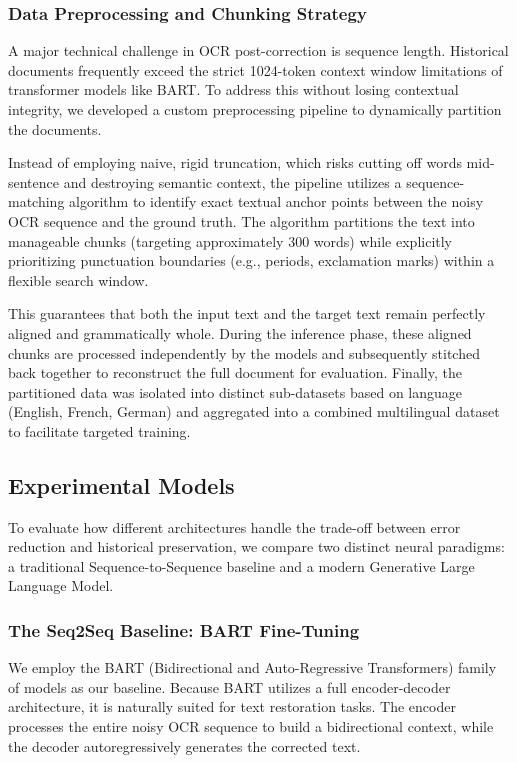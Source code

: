 \documentclass[11pt]{extarticle}
\begin{document}
\subsubsection{Data Preprocessing and Chunking Strategy}
A major technical challenge in OCR post-correction is sequence length. Historical documents frequently exceed the strict 1024-token context window limitations of transformer models like BART. To address this without losing contextual integrity, we developed a custom preprocessing pipeline to dynamically partition the documents.

Instead of employing naive, rigid truncation, which risks cutting off words mid-sentence and destroying semantic context, the pipeline utilizes a sequence-matching algorithm to identify exact textual anchor points between the noisy OCR sequence and the ground truth. The algorithm partitions the text into manageable chunks (targeting approximately 300 words) while explicitly prioritizing punctuation boundaries (e.g., periods, exclamation marks) within a flexible search window. 

This guarantees that both the input text and the target text remain perfectly aligned and grammatically whole. During the inference phase, these aligned chunks are processed independently by the models and subsequently stitched back together to reconstruct the full document for evaluation. Finally, the partitioned data was isolated into distinct sub-datasets based on language (English, French, German) and aggregated into a combined multilingual dataset to facilitate targeted training.

\subsection{Experimental Models}
To evaluate how different architectures handle the trade-off between error reduction and historical preservation, we compare two distinct neural paradigms: a traditional Sequence-to-Sequence baseline and a modern Generative Large Language Model.

\subsubsection{The Seq2Seq Baseline: BART Fine-Tuning}
We employ the BART (Bidirectional and Auto-Regressive Transformers) family of models as our baseline. Because BART utilizes a full encoder-decoder architecture, it is naturally suited for text restoration tasks. The encoder processes the entire noisy OCR sequence to build a bidirectional context, while the decoder autoregressively generates the corrected text. 
\end{document}
